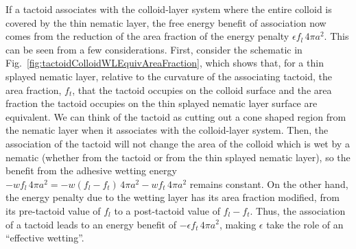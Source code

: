 \documentclass[%
 aip,
 amsmath,amssymb,
 reprint,%
]{revtex4-1}
\begin{document}
If a tactoid associates with the colloid-layer system where the entire colloid is covered by the thin nematic layer, the free energy benefit of association now comes from the reduction of the area fraction of the energy penalty $\epsilon f_{l} \, 4\pi a^2$. This can be seen from a few considerations. First, consider the schematic in Fig.~\ref{fig:tactoidColloidWLEquivAreaFraction}, which shows that, for a thin splayed nematic layer, relative to the curvature of the associating tactoid, the area fraction, $f_t$, that the tactoid occupies on the colloid surface and the area fraction the tactoid occupies on the thin splayed nematic layer surface are equivalent. We can think of the tactoid as cutting out a cone shaped region from the nematic layer when it associates with the colloid-layer system. Then, the association of the tactoid will not change the area of the colloid which is wet by a nematic (whether from the tactoid or from the thin splayed nematic layer), so the benefit from the adhesive wetting energy $-w f_l \, 4\pi a^2 = -w (f_l - f_t) \, 4\pi a^2  -w f_t \, 4\pi a^2$ remains constant. On the other hand, the energy penalty due to the wetting layer has its area fraction modified, from its pre-tactoid value of $f_l$ to a post-tactoid value of $f_l - f_t$. Thus, the association of a tactoid leads to an energy benefit of $-\epsilon f_t \, 4\pi a^2$, making $\epsilon$ take the role of an ``effective wetting''.



\end{document}
